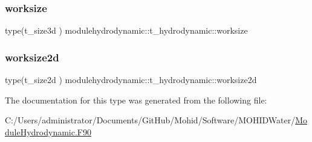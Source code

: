 \subsubsection{\texorpdfstring{worksize}{worksize}}
{\footnotesize\ttfamily type(t\+\_\+size3d ) modulehydrodynamic\+::t\+\_\+hydrodynamic\+::worksize\hspace{0.3cm}{\ttfamily [private]}}

\mbox{\label{structmodulehydrodynamic_1_1t__hydrodynamic_a548ab9d3c54227ad2c2fc884f6667f3f}} 
\subsubsection{\texorpdfstring{worksize2d}{worksize2d}}
{\footnotesize\ttfamily type(t\+\_\+size2d ) modulehydrodynamic\+::t\+\_\+hydrodynamic\+::worksize2d\hspace{0.3cm}{\ttfamily [private]}}



The documentation for this type was generated from the following file\+:\begin{DoxyCompactItemize}
\item 
C\+:/\+Users/administrator/\+Documents/\+Git\+Hub/\+Mohid/\+Software/\+M\+O\+H\+I\+D\+Water/\mbox{\hyperlink{_module_hydrodynamic_8_f90}{Module\+Hydrodynamic.\+F90}}\end{DoxyCompactItemize}

